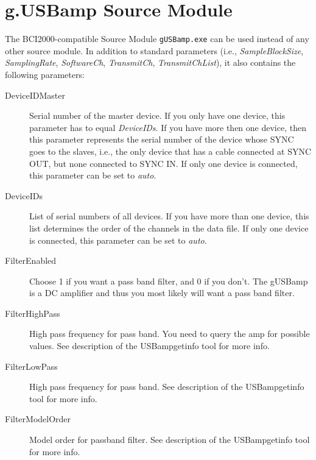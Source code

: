 \documentclass[letterpaper, oneside, 12pt]{article}
\newcommand{\ie}{i.e.,}
\begin{document}
\section{g.USBamp Source Module}

The BCI2000-compatible Source Module \texttt{gUSBamp.exe} can be used instead of 
any other source module. In addition to standard parameters (\ie{} 
\emph{SampleBlockSize}, \emph{SamplingRate}, \emph{SoftwareCh}, 
\emph{TransmitCh}, \emph{TransmitChList}), it also contains the following 
parameters:

\begin{description}
 \item [DeviceIDMaster] Serial number of the master device. 
                        If you only have one device, this 
                        parameter has to equal \emph{DeviceIDs}.
                        If you have more then one device, then
                        this parameter represents the serial
                        number of the device whose SYNC goes to
                        the slaves, i.e., the only device that 
                        has a cable connected at SYNC OUT, but 
                        none connected to SYNC IN. If only one
                        device is connected, this parameter
                        can be set to \emph{auto}.
 \item [DeviceIDs]      List of serial numbers of all devices.
                        If you have more than one device, this 
                        list determines the order of
                        the channels in the data file. If only one
                        device is connected, this parameter
                        can be set to \emph{auto}.
 \item [FilterEnabled]  Choose 1 if you want a pass band filter,
                        and 0 if you don't. The gUSBamp is a 
                        DC amplifier and thus you most likely
                        will want a pass band filter.
 \item [FilterHighPass] High pass frequency for pass band. You need to query
                        the amp for possible values. See description
                        of the USBampgetinfo tool for more info.
 \item [FilterLowPass]  High pass frequency for pass band. See description
                        of the USBampgetinfo tool for more info.
 \item [FilterModelOrder] Model order for passband filter. See description
                        of the USBampgetinfo tool for more info.

\end{description}
\end{document}

